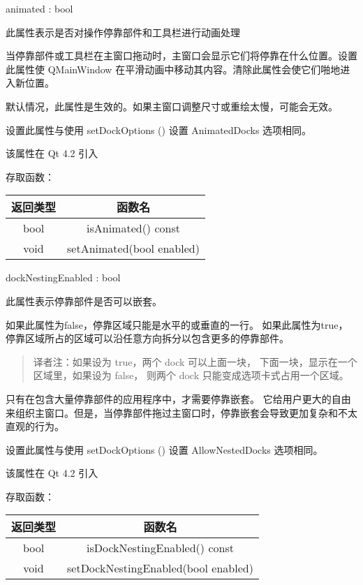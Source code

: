 animated : bool

此属性表示是否对操作停靠部件和工具栏进行动画处理

当停靠部件或工具栏在主窗口拖动时，主窗口会显示它们将停靠在什么位置。设置此属性使 QMainWindow 在平滑动画中移动其内容。清除此属性会使它们啪地进入新位置。

默认情况，此属性是生效的。如果主窗口调整尺寸或重绘太慢，可能会无效。

设置此属性与使用 setDockOptions () 设置 AnimatedDocks 选项相同。

该属性在 Qt 4.2 引入

存取函数：

\begin{tabular}{|c|c|}
\hline
    返回类型 &	函数名 \\ 
\hline
bool	& isAnimated() const \\ 
\hline
void	& setAnimated(bool enabled) \\ 
\hline
\end{tabular}

\splitLine

dockNestingEnabled : bool

此属性表示停靠部件是否可以嵌套。

如果此属性为false，停靠区域只能是水平的或垂直的一行。
如果此属性为true，停靠区域所占的区域可以沿任意方向拆分以包含更多的停靠部件。

\begin{quote}
译者注：如果设为 true，两个 dock 可以上面一块，
下面一块，显示在一个区域里，如果设为 false，
则两个 dock 只能变成选项卡式占用一个区域。
\end{quote}

只有在包含大量停靠部件的应用程序中，才需要停靠嵌套。
它给用户更大的自由来组织主窗口。但是，当停靠部件拖过主窗口时，停靠嵌套会导致更加复杂和不太直观的行为。

设置此属性与使用 setDockOptions () 设置 AllowNestedDocks 选项相同。

该属性在 Qt 4.2 引入

存取函数：

\begin{tabular}{|c|c|}
    \hline
    返回类型 &	函数名 \\ 
    \hline
    bool	& isDockNestingEnabled() const \\ 
    \hline
    void	& setDockNestingEnabled(bool enabled) \\ 
    \hline
    \end{tabular}

\splitLine

